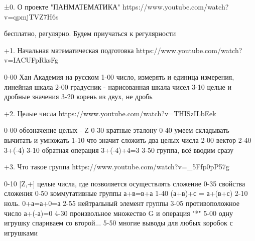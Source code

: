 ±0. О проекте "ПАНМАТЕМАТИКА"
https://www.youtube.com/watch?v=qpmjTVZ7H6s

бесплатно, регулярно. Будем приучаться к регулярности


+1. Начальная математическая подготовка
https://www.youtube.com/watch?v=IACUFpRksFg

0-00 Хан Академия на русском
1-00 число, измерять и единица измерения, линейная шкала
2-00 градусник - нарисованная шкала чисел
3-10 целые и дробные значения
3-20 корень из двух, не дробь


+2. Целые числа
https://www.youtube.com/watch?v=THISzILbEek

0-00 обозначение целых - Z
0-30 кратные эталону
0-40 умеем складывать вычитать и умножать
1-10 что значит сложить два целых числа
2-00 вектор
2-40 3+(-4)
3-10 обратная операция 3+(-4)+4=3
3-50 группа, всё вводим сразу

+3. Что такое группа
https://www.youtube.com/watch?v=_5Ffp0pP57g

0-10 [Z,+] целые числа, где позволяется осуществлять сложение
0-35 свойства сложения
0-50 коммутативные группы а+в=в+а
1-40 (а+в)+с = а+(в+с)
2-10 ноль. 0+а=а+0=а
2-55 нейтральный элемент группы
3-05 противоположное число а+(-а)=0
4-30 произвольное множество G и операция "*"
5-00 одну игрушку спариваем со второй...
5-50 многие выводы для любых коробок с игрушками